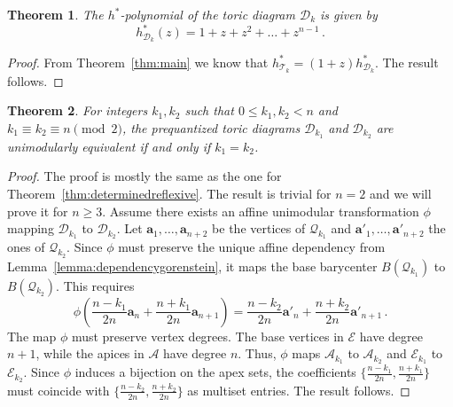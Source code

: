 \documentclass[a4paper,11pt,reqno]{amsart}
\newcommand{\Aa}{{\mathcal A}}
\newcommand{\Ee}{{\mathcal E}}
\newtheorem{theorem}{Theorem}[section]
\begin{document}
\begin{theorem}
The $h^\ast$-polynomial of the toric diagram $\mathcal{D}_k$ is given by 
\[
h^\ast_{\mathcal{D}_k} (z) = 1 + z + z^2 + \dots + z^{n-1}\,.
\]
\end{theorem}
\begin{proof}
From Theorem~\ref{thm:main} we know that 
$h^\ast_{\mathcal{T}_k}=(1+z) h^\ast_{\mathcal{D}_k}$. The result follows.
\end{proof}	

\begin{theorem} \label{thm:uniqueness}
For integers $k_1, k_2$ such that $0 \le k_1, k_2 < n$ and $k_1 \equiv k_2 \equiv n \pmod 2$, the prequantized 
toric diagrams $\mathcal{D}_{k_1}$ and $\mathcal{D}_{k_2}$ are unimodularly equivalent if and only if $k_1 = k_2$.
\end{theorem}
\begin{proof}
The proof is mostly the same as the one for Theorem~\ref{thm:determinedreflexive}. The result is trivial for $n=2$ 
and we will prove it for $n \ge 3$. Assume there exists an affine unimodular transformation $\phi$ mapping 
$\mathcal{D}_{k_1}$ to $\mathcal{D}_{k_2}$. Let $\bm{a}_1, \dots, \bm{a}_{n+2}$ be the vertices of $\mathcal{Q}_{k_1}$ 
and $\bm{a'}_1, \dots, \bm{a'}_{n+2}$ the ones of $\mathcal{Q}_{k_2}$. 
Since $\phi$ must preserve the unique affine dependency from Lemma~\ref{lemma:dependencygorenstein}, it maps 
the base barycenter $B(\mathcal{Q}_{k_1})$ to $B(\mathcal{Q}_{k_2})$. This requires
\[
\phi \left( \frac{n-k_1}{2n} \bm{a}_n + \frac{n+k_1}{2n} \bm{a}_{n+1} \right) 
= \frac{n-k_2}{2n} \bm{a'}_n + \frac{n+k_2}{2n} \bm{a'}_{n+1}\,.
\]
The map $\phi$ must preserve vertex degrees. The base vertices in $\Ee$ have degree $n+1$, while the apices in $\Aa$ 
have degree $n$. Thus, $\phi$ maps $\Aa_{k_1}$ to $\Aa_{k_2}$ and $\Ee_{k_1}$ to $\Ee_{k_2}$. 
Since $\phi$ induces a bijection on the apex sets, the coefficients $\{ \frac{n-k_1}{2n}, \frac{n+k_1}{2n} \}$ must coincide 
with $\{ \frac{n-k_2}{2n}, \frac{n+k_2}{2n} \}$ as multiset entries. The result follows.
\end{proof}
\end{document}
